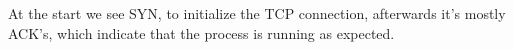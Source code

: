 At the start we see SYN, to initialize the TCP connection, afterwards it's mostly ACK's, which indicate that the process is running as expected.